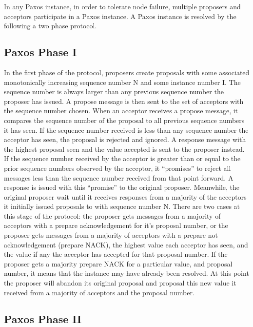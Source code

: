 \documentclass{article}
\begin{document}
In any Paxos instance, in order to tolerate node failure, multiple proposers and acceptors participate in a Paxos instance.
A Paxos instance is resolved by the following a two phase protocol.

\subsection{Paxos Phase I}

In the first phase of the protocol, proposers create proposals with some associated monotonically increasing sequence number N and some instance number I. 
The sequence number is always larger than any previous sequence number the proposer has issued. 
A propose message is then sent to the set of acceptors with the sequence number chosen. 
When an acceptor receives a propose message, it compares the sequence number of the proposal to all previous sequence numbers it has seen.
If the sequence number received is less than any sequence number the acceptor has seen, the proposal is rejected and ignored.
A response message with the highest proposal seen and the value accepted is sent to the proposer instead.
If the sequence number received by the acceptor is greater than or equal to the prior sequence numbers observed by the acceptor, it ``promises'' to reject all messages less than the sequence number received from that point forward.
A response is issued with this ``promise'' to the original proposer.
Meanwhile, the original proposer wait until it receives responses from a majority of the acceptors it initially issued proposals to with sequence number N.
There are two cases at this stage of the protocol: the proposer gets messages from a majority of acceptors with a prepare acknowledgement for it's proposal number, 
or the proposer gets messages from a majority of acceptors with a prepare not acknowledgement (prepare NACK), the highest value each acceptor has seen, and the value if any the acceptor has accepted for that proposal number.
If the proposer gets a majority prepare NACK for a particular value, and proposal number, it means that the instance may have already been resolved.
At this point the proposer will abandon its original proposal and proposal this new value it received from a majority of acceptors and the proposal number.

\subsection{Paxos Phase II}
\end{document}

